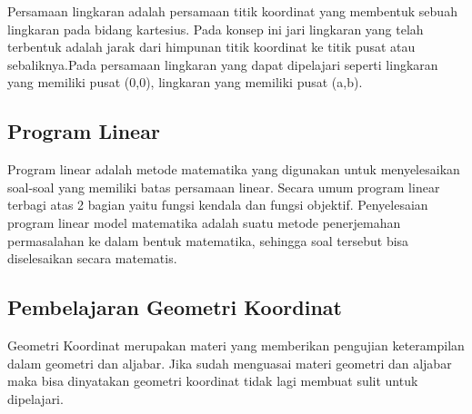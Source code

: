 Persamaan lingkaran adalah persamaan titik koordinat yang membentuk sebuah lingkaran pada bidang kartesius. Pada konsep ini jari lingkaran yang telah terbentuk adalah jarak dari himpunan titik koordinat ke titik pusat atau sebaliknya.Pada persamaan lingkaran yang dapat dipelajari seperti lingkaran yang memiliki pusat (0,0), lingkaran yang memiliki pusat (a,b).

 
 \subsection{Program Linear}
 Program linear adalah metode matematika yang digunakan untuk menyelesaikan soal-soal yang memiliki batas persamaan linear. Secara umum program linear terbagi atas 2 bagian yaitu fungsi kendala dan fungsi objektif. Penyelesaian program linear model matematika adalah suatu metode penerjemahan permasalahan ke dalam bentuk matematika, sehingga soal tersebut bisa diselesaikan secara matematis.
 
 \subsection{Pembelajaran Geometri Koordinat}
 Geometri Koordinat merupakan materi yang memberikan pengujian keterampilan dalam geometri dan aljabar.
 Jika sudah menguasai materi geometri dan aljabar maka bisa dinyatakan geometri koordinat tidak lagi membuat sulit untuk dipelajari.
